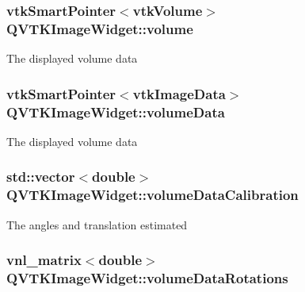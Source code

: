 \hypertarget{class_q_v_t_k_image_widget_a37424d6e8fd36a77aa8ab79e4aee5acf}{
\subsubsection[{volume}]{\setlength{\rightskip}{0pt plus 5cm}vtk\-Smart\-Pointer$<$vtk\-Volume$>$ {\bf Q\-V\-T\-K\-Image\-Widget\-::volume}}}\label{d8/dd7/class_q_v_t_k_image_widget_a37424d6e8fd36a77aa8ab79e4aee5acf}
The displayed volume data \hypertarget{class_q_v_t_k_image_widget_a5e2dcad8b7ea1a85c4b8052e9452844c}{
\subsubsection[{volume\-Data}]{\setlength{\rightskip}{0pt plus 5cm}vtk\-Smart\-Pointer$<$vtk\-Image\-Data$>$ {\bf Q\-V\-T\-K\-Image\-Widget\-::volume\-Data}}}\label{d8/dd7/class_q_v_t_k_image_widget_a5e2dcad8b7ea1a85c4b8052e9452844c}
The displayed volume data \hypertarget{class_q_v_t_k_image_widget_ad5069809b7e74c437884499f2aaaf0a0}{
\subsubsection[{volume\-Data\-Calibration}]{\setlength{\rightskip}{0pt plus 5cm}std\-::vector$<$double$>$ {\bf Q\-V\-T\-K\-Image\-Widget\-::volume\-Data\-Calibration}}}\label{d8/dd7/class_q_v_t_k_image_widget_ad5069809b7e74c437884499f2aaaf0a0}
The angles and translation estimated \hypertarget{class_q_v_t_k_image_widget_ab9aba72f9fc8e922555b96f30bd1dba3}{
\subsubsection[{volume\-Data\-Rotations}]{\setlength{\rightskip}{0pt plus 5cm}vnl\-\_\-matrix$<$double$>$ {\bf Q\-V\-T\-K\-Image\-Widget\-::volume\-Data\-Rotations}}}\label{d8/dd7/class_q_v_t_k_image_widget_ab9aba72f9fc8e922555b96f30bd1dba3}


